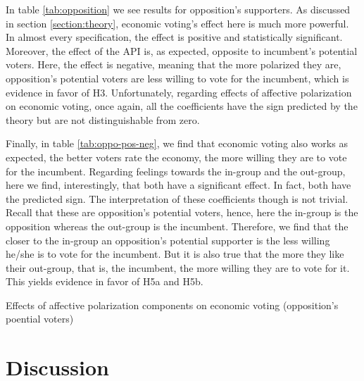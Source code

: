 \documentclass[a4paper, svgnames]{article}
\begin{document}
In table \ref{tab:opposition} we see results for opposition's supporters. As discussed in section \ref{section:theory}, economic voting's effect here is much more powerful. In almost every specification, the effect is positive and statistically significant. Moreover, the effect of the API is, as expected, opposite to incumbent's potential voters. Here, the effect is negative, meaning that the more polarized they are, opposition's potential voters are less willing to vote for the incumbent, which is evidence in favor of H3. Unfortunately, regarding effects of affective polarization on economic voting, once again, all the coefficients have the sign predicted by the theory but are not distinguishable from zero.

Finally, in table \ref{tab:oppo-pos-neg}, we find that economic voting also works as expected, the better voters rate the economy, the more willing they are to vote for the incumbent. Regarding feelings towards the in-group and the out-group, here we find, interestingly, that both have a significant effect. In fact, both have the predicted sign. The interpretation of these coefficients though is not trivial. Recall that these are opposition's potential voters, hence, here the in-group is the opposition whereas the out-group is the incumbent. Therefore, we find that the closer to the in-group an opposition's potential supporter  is the less willing he/she is to vote for the incumbent. But it is also true that the more they like their out-group, that is, the incumbent, the more willing they are to vote for it. This yields evidence in favor of H5a and H5b.

\begin{table}[H]
	\centering
	\caption{\label{tab:opposition-pos-neg} Effects of affective polarization components on economic voting (opposition's poential voters)}
	\label{tab:oppo-pos-neg}
	

\end{table}


\section{Discussion}
\end{document}
